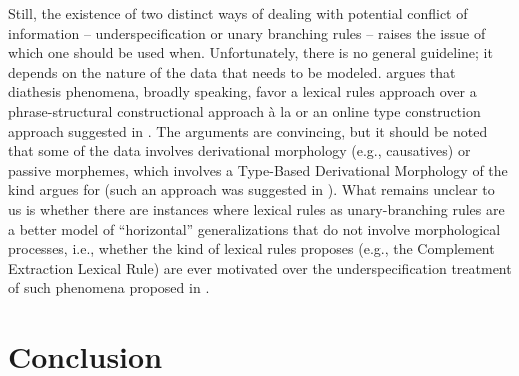 \documentclass[output=paper,biblatex,babelshorthands,newtxmath,draftmode,colorlinks,citecolor=brown]{langscibook}
\begin{document}
Still, the existence of two distinct ways of dealing with potential conflict of information -- underspecification or unary branching rules -- raises the issue of which one should be used when. Unfortunately, there is no general guideline; it depends on the nature of the data that needs to be modeled. \citet{Mueller2006,Mueller2010} argues that diathesis phenomena, broadly speaking, favor a lexical rules approach over a phrase-structural constructional approach à la \citet{Goldberg1995}\indexcxg or an online type construction approach suggested in . The arguments are convincing, but it should be noted that some of the data involves derivational morphology (e.g., causatives) or passive morphemes, which involves a Type-Based Derivational Morphology of the kind \citet{Riehemann98a} argues for (such an approach was suggested in \citealt[Chapter~4]{Koenig1999c}). What remains unclear to us is whether there are instances where lexical rules as unary-branching rules are a better model of ``horizontal'' generalizations that do not involve morphological processes, i.e., whether the kind of lexical rules \citet{PollardandSag1994} proposes (e.g., the Complement Extraction Lexical Rule) are ever motivated over the  underspecification treatment of such phenomena proposed in \citet{Boumaetal2001}.

\section{Conclusion}
\end{document}
